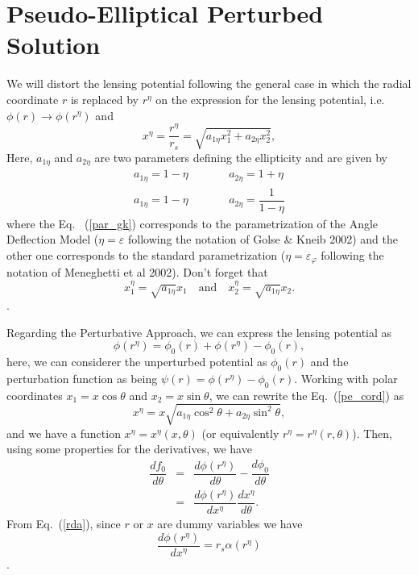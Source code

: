 \documentclass[a4paper,twoside]{article}
\def \rs {r_s}
\def \ret {r^\eta}
\def \po {\phi_0}
\def \al {\alpha}
\def \te {\theta}
\def \ae {a_{1\eta}}
\def \be {a_{2\eta}}
\def \xe {x^\eta}
\begin{document}
\section{\label{secpeper}Pseudo-Elliptical Perturbed Solution}
We will distort the lensing potential following the general case in which the radial coordinate $r$ is replaced by $\ret$ on 
the expression for the lensing potential, i.e. $\phi(r)\rightarrow\phi(\ret)$ and
\begin{equation}
\xe=\dfrac{\ret}{\rs}=\sqrt{\ae x_1^2+ \be x_2^2},
\label{pe_cord}
\end{equation}
Here, $\ae$ and $\be$ are two parameters defining the ellipticity and are given by
\begin{eqnarray}
\ae=1-\eta &\qquad& \be =1+\eta \label{par_gk}\\
\ae=1-\eta &\qquad & \be =\dfrac{1}{1-\eta} \label{par_gen}
\end{eqnarray}
where the Eq.~ (\ref{par_gk}) corresponds to the parametrization of the Angle Deflection Model ($\eta=\varepsilon$ following the notation of  Golse \& Kneib 2002) and the other one corresponds to the standard parametrization ($\eta=\varepsilon_\varphi$ following the notation of Meneghetti et al 2002). Don't forget that
\begin{equation*} x_1^\eta=\sqrt{\ae}x_1 \quad \textrm{and} \quad x_2^\eta=\sqrt{\ae}x_2. \end{equation*}.

Regarding the Perturbative Approach, we can express the lensing potential as
\begin{equation*}
\phi(\ret)=\po(r)+\phi(\ret)-\po(r),
\end{equation*}
here, we can considerer the unperturbed potential as $\po(r)$ and the perturbation function as being $\psi(r)=\phi(\ret)-\po(r)$.
Working with polar coordinates $x_1=x\cos{\te}$ and $x_2=x\sin{\te}$, we can rewrite the  Eq.~(\ref{pe_cord}) as
\begin{equation}
\xe=x\sqrt{\ae\cos^2{\te}+\be\sin^2{\te}},
\label{xepol}
\end{equation}
\noindent and we have a function $\xe=\xe(x,\te)$ (or equivalently $\ret=\ret(r,\te)$). Then, using some properties for the derivatives,
we have
\begin{eqnarray}
\dfrac{d f_0}{d\te}&=&\dfrac{d \phi(\ret)}{d \te}-\dfrac{d\po}{d\te} \nonumber \\
                   &=& \dfrac{d\phi(\ret)}{d\xe}\dfrac{d\xe}{d\te} \label{nfwdf0dt}.
\end{eqnarray}
From Eq.~(\ref{rda}), since $r$ or $x$ are dummy variables we have
\begin{equation*} \dfrac{d\phi(\ret)}{d\xe}=\rs\al(r^\eta) \end{equation*}.
\end{document}
